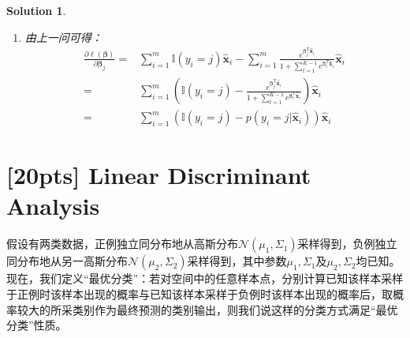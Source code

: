 \documentclass[a4paper,UTF8]{article}
\numberwithin{equation}{section}
\newtheorem*{solution}{Solution}
\begin{document}
\begin{solution}
\begin{enumerate}
\begin{equation}
\begin{aligned}
=&\sum_{i=1}^{m}\sum_{j=1}^{K-1}\mathbb{I}(y_i=j)(\mathbf{w}_j^\mathrm{T}\mathbf{x}+b_j) - \sum_{i=1}^{m}\ln(1 + \sum_{t=1}^{K-1}e^{\mathbf{w}_t^\mathrm{T}\mathbf{x}_i+b_t})
\end{aligned}
\end{equation}
再令$\boldsymbol{\beta}_j = (\mathbf{w}_j; b_j)$以及$\hat{\mathbf{x}} = (\mathbf{x}; 1)$，可以有
\begin{equation}
\ell(\boldsymbol{\beta}) = \sum_{i=1}^{m}\sum_{j=1}^{K-1}\mathbb{I}(y_i=j)(\boldsymbol{\beta}_j^\mathrm{T}\hat{\mathbf{x}}_i) - \sum_{i=1}^{m}\ln(1 + \sum_{t=1}^{K-1}e^{\boldsymbol{\beta}_t^\mathrm{T}\hat{\mathbf{x}}_i})
\end{equation}

\item
由上一问可得：
\begin{equation}
\begin{aligned}
\frac{\partial\ell(\boldsymbol{\beta})}{\partial\boldsymbol{\beta}_j} 
=& \sum_{i=1}^{m}\mathbb{I}(y_i=j)\hat{\mathbf{x}}_i - \sum_{i=1}^{m}\frac{e^{\boldsymbol{\beta}_j^\mathrm{T}\hat{\mathbf{x}}_i}}{1 + \sum_{t=1}^{K-1}e^{\boldsymbol{\beta}_t^\mathrm{T}\hat{\mathbf{x}}_i}}\hat{\mathbf{x}}_i\\
=& \sum_{i=1}^{m}(\mathbb{I}(y_i=j) - \frac{e^{\boldsymbol{\beta}_j^\mathrm{T}\hat{\mathbf{x}}_i}}{1 + \sum_{t=1}^{K-1}e^{\boldsymbol{\beta}_t^\mathrm{T}\hat{\mathbf{x}}_i}})\hat{\mathbf{x}}_i\\
=& \sum_{i=1}^{m}(\mathbb{I}(y_i=j) - 	p(y_i=j|\hat{\mathbf{x}}_i))\hat{\mathbf{x}}_i
\end{aligned}
\end{equation} 

\end{enumerate}	
	
\end{solution}
\newpage


\section{[20pts] Linear Discriminant Analysis}
假设有两类数据，正例独立同分布地从高斯分布$\mathcal{N}(\mu_1,\Sigma_1)$采样得到，负例独立同分布地从另一高斯分布$\mathcal{N}(\mu_2,\Sigma_2)$采样得到，其中参数$\mu_1,\Sigma_1$及$\mu_2,\Sigma_2$均已知。现在，我们定义“最优分类”：若对空间中的任意样本点，分别计算已知该样本采样于正例时该样本出现的概率与已知该样本采样于负例时该样本出现的概率后，取概率较大的所采类别作为最终预测的类别输出，则我们说这样的分类方式满足“最优分类”性质。
\end{document}

